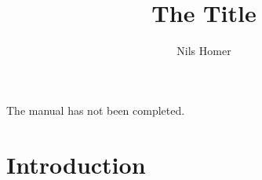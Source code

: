 \documentclass[twocolumn]{article}
\author{Nils Homer}
\date{}
\title{The Title}
\begin{document}
\maketitle
\newpage
The manual has not been completed.

\tableofcontents
\section{Introduction}
\end{document}
